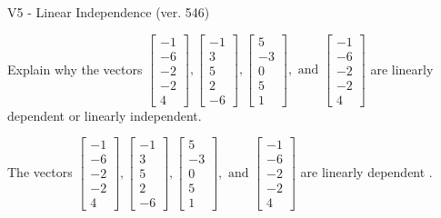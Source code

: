 \begin{exercise}
  \begin{exerciseTitle}V5 - Linear Independence (ver. 546)\end{exerciseTitle}
  \begin{exerciseStatement}
    Explain why the vectors \(\left[\begin{array}{r}
-1 \\
-6 \\
-2 \\
-2 \\
4
\end{array}\right] , \left[\begin{array}{r}
-1 \\
3 \\
5 \\
2 \\
-6
\end{array}\right] , \left[\begin{array}{r}
5 \\
-3 \\
0 \\
5 \\
1
\end{array}\right] , \text{ and } \left[\begin{array}{r}
-1 \\
-6 \\
-2 \\
-2 \\
4
\end{array}\right]\) are linearly dependent or linearly independent.	


  \end{exerciseStatement}
  \begin{exerciseAnswer}
   The vectors \(\left[\begin{array}{r}
-1 \\
-6 \\
-2 \\
-2 \\
4
\end{array}\right] , \left[\begin{array}{r}
-1 \\
3 \\
5 \\
2 \\
-6
\end{array}\right] , \left[\begin{array}{r}
5 \\
-3 \\
0 \\
5 \\
1
\end{array}\right] , \text{ and } \left[\begin{array}{r}
-1 \\
-6 \\
-2 \\
-2 \\
4
\end{array}\right]\) are 
  	 linearly dependent  .
  


  \end{exerciseAnswer}
\end{exercise}